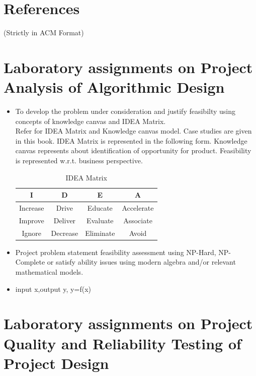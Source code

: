 \documentclass[oneside,a4paper,12pt]{report}
\begin{document}
\begin{appendices}

\chapter{References}
(Strictly in ACM Format)

\chapter{Laboratory assignments on Project Analysis of Algorithmic Design}
\begin{itemize}
\item To develop the problem under consideration and justify feasibilty using
concepts of knowledge canvas and IDEA Matrix.\\
Refer \cite{innovationbook} for IDEA Matrix and Knowledge canvas model. Case studies are given in this book. IDEA Matrix is represented in the following form. Knowledge canvas represents about identification  of opportunity for product. Feasibility is represented w.r.t. business perspective.\\

\begin{table}[!htbp]
\begin{center}
  \begin{tabular}{| c | c | c | c |}
\hline
 I & D & E & A \\
\hline
Increase & Drive & Educate & Accelerate \\
\hline
Improve & Deliver & Evaluate & Associate  \\
 \hline
Ignore & Decrease & Eliminate & Avoid \\
\hline
\end{tabular}
 \caption { IDEA Matrix }
 \label{tab:imatrix}
\end{center}
\end{table}

\item Project problem statement feasibility assessment using NP-Hard, NP-Complete or satisfy ability issues using modern algebra and/or relevant mathematical models.
\item input x,output y, y=f(x)
\end{itemize}

\chapter{Laboratory assignments on Project Quality and Reliability Testing of Project Design}


\end{appendices}
\end{document}
